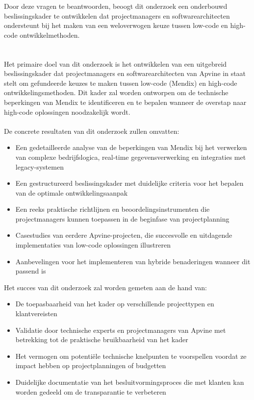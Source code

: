 Door deze vragen te beantwoorden, beoogt dit onderzoek een onderbouwd beslissingskader te ontwikkelen dat projectmanagers en softwarearchitecten ondersteunt bij het maken van een weloverwogen keuze tussen low-code en high-code ontwikkelmethoden.

\section{}%
\label{sec:onderzoeksdoelstelling}
Het primaire doel van dit onderzoek is het ontwikkelen van een uitgebreid beslissingskader dat projectmanagers en softwarearchitecten van Apvine in staat stelt om gefundeerde keuzes te maken tussen low-code (Mendix) en high-code ontwikkelingsmethoden. Dit kader zal worden ontworpen om de technische beperkingen van Mendix te identificeren en te bepalen wanneer de overstap naar high-code oplossingen noodzakelijk wordt.
\\
\\
De concrete resultaten van dit onderzoek zullen omvatten:
\begin{itemize}
\item Een gedetailleerde analyse van de beperkingen van Mendix bij het verwerken van complexe bedrijfslogica, real-time gegevensverwerking en integraties met legacy-systemen
\item Een gestructureerd beslissingskader met duidelijke criteria voor het bepalen van de optimale ontwikkelingsaanpak
\item Een reeks praktische richtlijnen en beoordelingsinstrumenten die projectmanagers kunnen toepassen in de beginfase van projectplanning
\item Casestudies van eerdere Apvine-projecten, die succesvolle en uitdagende implementaties van low-code oplossingen illustreren
\item Aanbevelingen voor het implementeren van hybride benaderingen wanneer dit passend is
\end{itemize}


Het succes van dit onderzoek zal worden gemeten aan de hand van:
\begin{itemize}
\item De toepasbaarheid van het kader op verschillende projecttypen en klantvereisten
\item Validatie door technische experts en projectmanagers van Apvine met betrekking tot de praktische bruikbaarheid van het kader
\item Het vermogen om potentiële technische knelpunten te voorspellen voordat ze impact hebben op projectplanningen of budgetten
\item Duidelijke documentatie van het besluitvormingsproces die met klanten kan worden gedeeld om de transparantie te verbeteren
\end{itemize}


